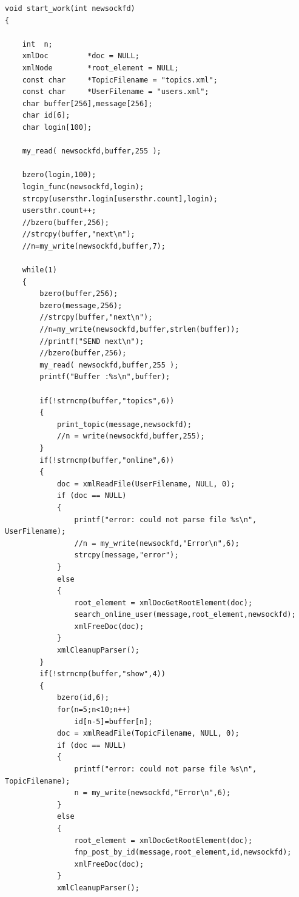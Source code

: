\documentclass[10pt,a4paper]{report}
\begin{document}
\begin{verbatim}
void start_work(int newsockfd)
{

    int  n;
    xmlDoc         *doc = NULL;
    xmlNode        *root_element = NULL;
    const char     *TopicFilename = "topics.xml";
    const char     *UserFilename = "users.xml";
    char buffer[256],message[256];
    char id[6];
    char login[100];

    my_read( newsockfd,buffer,255 );

    bzero(login,100);
    login_func(newsockfd,login);
    strcpy(usersthr.login[usersthr.count],login);
    usersthr.count++;
    //bzero(buffer,256);
    //strcpy(buffer,"next\n");
    //n=my_write(newsockfd,buffer,7);

    while(1)
    {
        bzero(buffer,256);
        bzero(message,256);
        //strcpy(buffer,"next\n");
        //n=my_write(newsockfd,buffer,strlen(buffer));
        //printf("SEND next\n");
        //bzero(buffer,256);
        my_read( newsockfd,buffer,255 );
        printf("Buffer :%s\n",buffer);

        if(!strncmp(buffer,"topics",6))
        {
            print_topic(message,newsockfd);
            //n = write(newsockfd,buffer,255);
        }
        if(!strncmp(buffer,"online",6))
        {
            doc = xmlReadFile(UserFilename, NULL, 0);
            if (doc == NULL)
            {
                printf("error: could not parse file %s\n", UserFilename);
                //n = my_write(newsockfd,"Error\n",6);
                strcpy(message,"error");
            }
            else
            {
                root_element = xmlDocGetRootElement(doc);
                search_online_user(message,root_element,newsockfd);
                xmlFreeDoc(doc);
            }
            xmlCleanupParser();
        }
        if(!strncmp(buffer,"show",4))
        {
            bzero(id,6);
            for(n=5;n<10;n++)
                id[n-5]=buffer[n];
            doc = xmlReadFile(TopicFilename, NULL, 0);
            if (doc == NULL)
            {
                printf("error: could not parse file %s\n", TopicFilename);
                n = my_write(newsockfd,"Error\n",6);
            }
            else
            {
                root_element = xmlDocGetRootElement(doc);
                fnp_post_by_id(message,root_element,id,newsockfd);
                xmlFreeDoc(doc);
            }
            xmlCleanupParser();


\end{verbatim}
\end{document}
